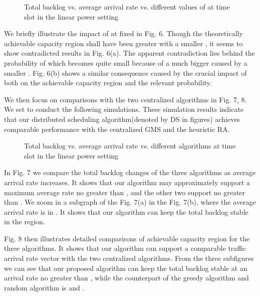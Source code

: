 \documentclass[journal]{IEEEtran}
\begin{document}
\begin{figure}[h]
    \centering
  \hspace{0cm}
   \caption{{\small{Total backlog vs. average arrival rate vs. different values of  at time slot  in the linear power setting}}}
\end{figure}
We briefly illustrate the impact of  at fixed  in Fig. 6. Though the theoretically achievable capacity region shall have been greater with a smaller , it seems to show contradicted results in Fig. 6(a). The apparent contradiction lies behind the probability of  which becomes quite small because of a much bigger  caused by a smaller .   Fig. 6(b) shows a similar consequence caused by the crucial impact of  both on the achievable capacity region and the relevant probability.

We then focus on comparisons with the two centralized algorithms in Fig. 7, 8. We set  to conduct the following simulations. These simulation results indicate that our distributed scheduling algorithm(denoted by DS in figures) achieves comparable performance with the centralized GMS and the heuristic RA.
\begin{figure}[htpb]
    \centering
  \hspace{0cm}
     \caption{{\small{Total backlog vs. average arrival rate  vs. different algorithms at time slot  in the linear power setting} }}
\end{figure}

In Fig. 7 we compare the total backlog changes of the three algorithms as average arrival rate increases. It shows that our algorithm may approximately support a maximum average rate no greater than , and the other two support  no greater than . We zoom in a subgraph of the Fig. 7(a) in the Fig. 7(b), where the average arrival rate is in . It shows that our algorithm can keep the total backlog stable in the region.
\begin{comment}
We then carefully compare the total backlog fluctuation from time slot  to time slot  at average arrival rate , where the DS, RA, GMS is respectively under an unstable point, as illustrated in Fig. 7.
\end{comment}
Fig. 8 then illustrates detailed comparisons of achievable capacity region for the three algorithms. It shows that our algorithm can support a comparable traffic arrival rate vector with the two centralized algorithms.  From the three subfigures we can see that our proposed algorithm can keep the total backlog stable at an arrival rate no greater than , while the counterpart of the greedy algorithm and random algorithm is  and .
\end{document}
